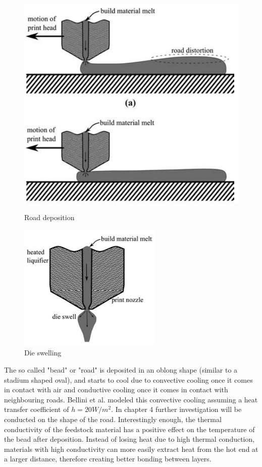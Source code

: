 \begin{figure}
\centering
\begin{minipage}{.5\textwidth}
  \centering
    \includegraphics[width=.6\textwidth]{chapter_2/figures/Extrusion.PNG}
   \caption{Road deposition \cite{Turner2014AModeling}}
    \label{fig:Roaddepostion}
\end{minipage}%
\begin{minipage}{.5\textwidth}
  \centering
  \includegraphics[width=.6\textwidth]{chapter_2/figures/dieswelling.PNG}
    \caption{Die swelling \cite{Turner2014AModeling}}
    \label{fig:dieswelling}
\end{minipage}
\end{figure}

The so called "bead" or "road" is deposited in an oblong shape (similar to a stadium shaped oval), and starts to cool due to convective cooling once it comes in contact with air and conductive cooling once it comes in contact with neighbouring roads. Bellini et al. \cite{Bellini2003MechanicalModeling} modeled this convective cooling assuming a heat transfer coefficient of $h =20 W/m^2$. In chapter 4 further investigation will be conducted on the shape of the road. Interestingly enough, the thermal conductivity of the feedstock material has a positive effect on the temperature of the bead after deposition. Instead of losing heat due to high thermal conduction, materials with high conductivity can more easily extract heat from the hot end at a larger distance, therefore creating better bonding between layers. 

